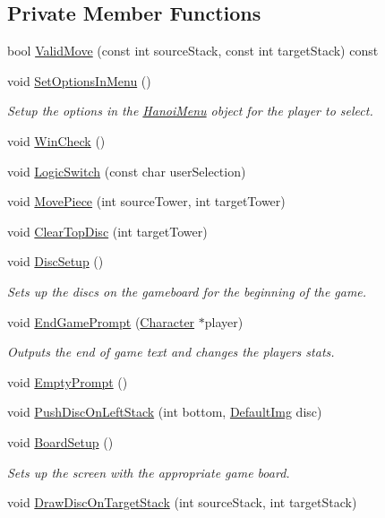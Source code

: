 \subsection*{Private Member Functions}
\begin{DoxyCompactItemize}
\item 
bool \hyperlink{classHanoi_a509e940edaa6135c5b883c93c901e38f}{Valid\-Move} (const int source\-Stack, const int target\-Stack) const 
\item 
void \hyperlink{classHanoi_a4dd4c6028ade2b265ce98e48c3f2fb2a}{Set\-Options\-In\-Menu} ()
\begin{DoxyCompactList}\small\item\em Setup the options in the \hyperlink{classHanoiMenu}{Hanoi\-Menu} object for the player to select. \end{DoxyCompactList}\item 
void \hyperlink{classHanoi_aefbb40fc625506daa131076206e85b69}{Win\-Check} ()
\item 
void \hyperlink{classHanoi_ac2a9f2762281242491b736caae5baea9}{Logic\-Switch} (const char user\-Selection)
\item 
void \hyperlink{classHanoi_ace4cf62c16bc617ac158171a94b9b6a1}{Move\-Piece} (int source\-Tower, int target\-Tower)
\item 
void \hyperlink{classHanoi_af46c88d825078b8255128c53f717cf8d}{Clear\-Top\-Disc} (int target\-Tower)
\item 
void \hyperlink{classHanoi_a95845d40d6b0594cc69612c6421333a2}{Disc\-Setup} ()
\begin{DoxyCompactList}\small\item\em Sets up the discs on the gameboard for the beginning of the game. \end{DoxyCompactList}\item 
void \hyperlink{classHanoi_a56d34cbc5ea671b500583e50450cb5f8}{End\-Game\-Prompt} (\hyperlink{classCharacter}{Character} $\ast$player)
\begin{DoxyCompactList}\small\item\em Outputs the end of game text and changes the players stats. \end{DoxyCompactList}\item 
void \hyperlink{classHanoi_aa3eddb6c7dd6e290475ae2620995c339}{Empty\-Prompt} ()
\item 
void \hyperlink{classHanoi_a47fdd8cbbb4b12ea2941c639868236bc}{Push\-Disc\-On\-Left\-Stack} (int bottom, \hyperlink{classDefaultImg}{Default\-Img} disc)
\item 
void \hyperlink{classHanoi_a5dc7aab5bfe9d0b9d83ba75be22412e2}{Board\-Setup} ()
\begin{DoxyCompactList}\small\item\em Sets up the screen with the appropriate game board. \end{DoxyCompactList}\item 
void \hyperlink{classHanoi_a7ed013f980f79fb4d4bd5efbc0fef633}{Draw\-Disc\-On\-Target\-Stack} (int source\-Stack, int target\-Stack)
\end{DoxyCompactItemize}
